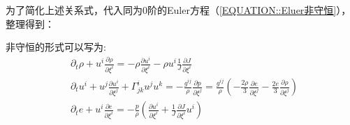 \documentclass[MathematicsNumericsDerivationsAndOpenFOAM.tex]{subfiles}
\begin{document}


为了简化上述关系式，代入同为0阶的Euler方程（\ref{EQUATION::Eluer非守恒}），整理得到：

非守恒的形式可以写为:
\begin{equation}
  \begin{aligned}
     & \partial_{t} \rho+ u^i \frac{\partial \rho}{\partial \xi^i}=-\rho \frac{\partial u^i}{\partial \xi^i}-\rho u^i \frac{1}{J} \frac{\partial J}{\partial \xi^i}
    \\
     & \partial_{t}u^{i}+u^j \frac{\partial u^i}{\partial \xi^{j}}+\Gamma_{j k}^{i}  u^{j} u^{k}=-\frac{g^{i j}}{\rho} \frac{\partial p}{\partial \xi^{j}}= \frac{g^{i j}}{\rho} (-\frac{2\rho}{3}\frac{\partial e}{\partial \xi^j} - \frac{2e}{3}\frac{\partial \rho}{\partial \xi^j}) \\
     & \partial_{t}e + u^i\frac{\partial e}{\partial  \xi^{i}}  = -  \frac{p}{\rho} (\frac{\partial  u^i}{\partial \xi^{i}}  + \frac{1}{J} \frac{\partial J}{\partial \xi^i}u^i)                                                                                                        \\
  \end{aligned}
  \label{EQUATION::Eluer非守恒} ~
\end{equation}
\end{document}
